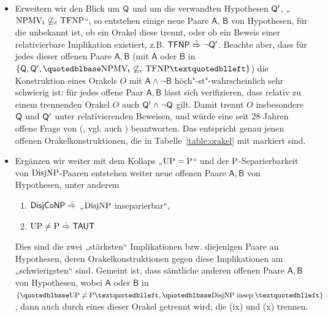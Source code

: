 \begin{itemize}[parsep=0pt,listparindent=\parindent,itemsep=5pt plus 1pt minus 1pt,midpenalty=0]
\item Erweitern wir den Blick um $\hQ$ und um die verwandten Hypothesen $\hQ'$, „$\NPMVt\not\subseteqc \TFNP$“, so entstehen einige neue Paare $\mathsf{A}$, $\mathsf{B}$ von Hypothesen, für die unbekannt ist, ob ein Orakel diese trennt, oder ob ein Beweis einer relativierbare Implikation existiert, z.B. $\hTFNP\stackrel{\smash{\text{\raisebox{-1pt}{\tiny ?}}}}{\Rightarrow}\neg\hQ'$. Beachte aber, dass für jedes dieser offenen Paare $\mathsf{A,B}$ (mit $\mathsf A$ oder $\mathsf B$ in $\{\hQ, \hQ', „\NPMVt\not\subseteqc \TFNP“\}$) die Konstruktion eines Orakels $O$ mit $\mathsf{A\land \neg B}$ höch"-st"-wahrscheinlich sehr schwierig ist: für jedes offene Paar $\mathsf{A,B}$ lässt sich verifizieren, dass relativ zu einem trennenden Orakel $O$ auch $\hQ'\land \neg \hQ$ gilt. Damit trennt $O$ insbesondere $\hQ$ und $\hQ'$ unter relativierenden Beweisen, und würde eine seit 28 Jahren offene Frage von \citeauthor{fenner_inverting_2003} (\citeyear{fenner_inverting_2003}, vgl. auch \citeyear{fenner_inverting_1996}) beantworten. Das entspricht genau jenen offenen Orakelkonstruktionen, die in Tabelle~\ref{table:orakel} mit \dag{} markiert sind.

    \item Ergänzen wir weiter mit dem Kollaps „$\UP=\P$“ und der $\P$-Separierbarkeit von $\DisjNP$-Paaren entstehen weiter neue offenen Paare $\mathsf{A,B}$ von Hypothesen, unter anderem
        \begin{enumerate}[noitemsep,resume,label=(\roman*)]
            \item $\hDisjCoNP\stackrel{\smash{\text{\raisebox{-1pt}{\tiny ?}}}}{\Rightarrow}$ „$\DisjNP$ inseparierbar“,
            \item $\UP\neq\P\stackrel{\smash{\text{\raisebox{-1pt}{\tiny ?}}}}{\Rightarrow} \hTAUT$
        \end{enumerate}
        Dies sind die zwei „stärksten“ Implikationen bzw. diejenigen Paare an Hypothesen, deren Orakelkonstruktionen gegen diese Implikationen am „schwierigsten“ sind. Gemeint ist, dass sämtliche anderen offenen Paare $\mathsf{A,B}$ von Hypothesen, wobei $\mathsf{A}$ oder $\mathsf{B}$ in $\{„\UP\neq\P“, „\DisjNP\text{ insep.}“\}$, dann auch durch eines dieser Orakel getrennt wird, die (ix) und (x) trennen.


\end{itemize}
